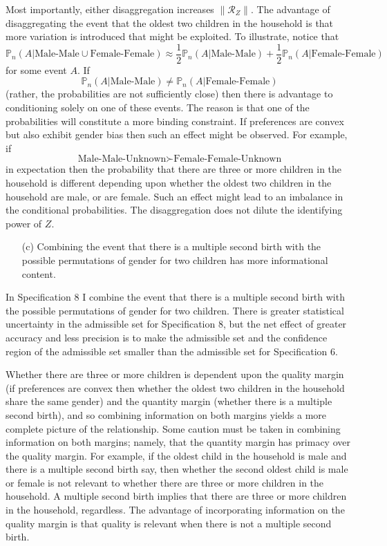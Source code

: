 \documentclass[12pt,a4paper,twoside]{article}
\numberwithin{equation}{section}
\begin{document}
Most importantly, either disaggregation increases $\|\mathcal{R}_Z\|$. The advantage of disaggregating the event that the oldest two children in the household is that more variation is introduced that might be exploited. To illustrate, notice that
\[\mathbb{P}_n(A|\text{Male-Male}\cup\text{Female-Female})\approx\frac{1}{2}\mathbb{P}_n(A|\text{Male-Male})+\frac{1}{2}\mathbb{P}_n(A|\text{Female-Female})\]
for some event $A$. If 
\[\mathbb{P}_n(A|\text{Male-Male})\neq\mathbb{P}_n(A|\text{Female-Female})\]
(rather, the probabilities are not sufficiently close) then there is advantage to conditioning solely on one of these events. The reason is that one of the probabilities will constitute a more binding constraint. If preferences are convex but also exhibit gender bias then such an effect might be observed. For example, if 
\[\text{Male-Male-Unknown}\succ\text{Female-Female-Unknown}\]
in expectation then the probability that there are three or more children in the household is different depending upon whether the oldest two children in the household are male, or are female. Such an effect might lead to an imbalance in the conditional probabilities. The disaggregation does not dilute the identifying power of $Z$.   
\begin{enumerate}
\item[(c)] Combining the event that there is a multiple second birth with the possible permutations of gender for two children has more informational content. 
\end{enumerate}
In Specification 8 I combine the event that there is a multiple second birth with the possible permutations of gender for two children. There is greater statistical uncertainty in the admissible set for Specification 8, but the net effect of greater accuracy and less precision is to make the admissible set and the confidence region of the admissible set smaller than the admissible set for Specification 6. 

Whether there are three or more children is dependent upon the quality margin (if preferences are convex then whether the oldest two children in the household share the same gender) and the quantity margin (whether there is a multiple second birth), and so combining information on both margins yields a more complete picture of the relationship. Some caution must be taken in combining information on both margins; namely, that the quantity margin has primacy over the quality margin. For example, if the oldest child in the household is male and there is a multiple second birth say, then whether the second oldest child is male or female is not relevant to whether there are three or more children in the household. A multiple second birth implies that there are three or more children in the household, regardless. The advantage of incorporating information on the quality margin is that quality is relevant when there is not a multiple second birth. 
\end{document}
